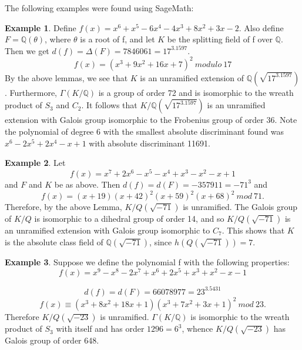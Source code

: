 \documentclass[12pt]{extarticle}
\newcommand{\<}{\langle}
\renewcommand{\>}{\rangle}
\theoremstyle{definition}
\newtheorem*{example}{Example}
\begin{document}
The following examples were found using SageMath:
\begin{example}
Define $f(x)=x^6 + x^5 - 6x^4 - 4x^3 + 8x^2 + 3x - 2$. Also define $F=\mathbb{Q}(\theta)$, where $\theta$ is a root of f, and let $K$ be the splitting field of f over $\mathbb{Q}$. Then we get $d(f)=\Delta(F)=7846061=17^3.1597$. 
\begin{equation}
   f(x)= (x^3 + 9x^2 + 16x + 7)^2\:modulo\:17
\end{equation}
By the above lemmas, we see that $K$ is an unramified extension of $\mathbb{Q}(\sqrt{17^3.1597})$. Furthermore, $\Gamma(K/\mathbb{Q})$ is a group of order 72 and is isomorphic to the wreath product of $S_3$ and $C_2$. It follows that $K/\mathbb{Q}(\sqrt{17^3.1597})$ is an unramified extension with Galois group isomorphic to the Frobenius group of order 36.
Note the polynomial of degree 6 with the smallest absolute discriminant found was $x^6 - 2x^5 + 2x^4 - x + 1$ with absolute discriminant 11691.
\end{example}
\begin{example}
 Let \begin{equation}
     f(x)=x^7 + 2x^6 - x^5 - x^4 + x^3 - x^2 - x + 1
 \end{equation}and $F$ and $K$ be as above.
Then $d(f)=d(F)=-357911=-71^{3}$ and
\begin{equation}
    f(x)=(x + 19)(x + 42)^2 (x + 59)^2(x + 68)^2\:mod\:71.
\end{equation}
Therefore, by the above Lemma, $K/Q(\sqrt{-71})$ is unramified. The Galois group of $K/Q$
is isomorphic to a dihedral group of order 14, and so $K/Q(\sqrt{-71})$
is an unramified extension with Galois group isomorphic to $C_7$.
This shows that $K$ is the absolute class field of $\mathbb{Q}(\sqrt{-71})$, since $h(Q(\sqrt{-71}))=7$.
\end{example}
\begin{example}
    Suppose we define the polynomial f with the following properties: \begin{equation}
        f(x) =x^9 - x^8 - 2x^7 + x^6 + 2x^5 + x^3 + x^2 - x - 1
    \end{equation} \par
    \begin{equation}
        d(f)=d(F)=66078977=23^3.5431
    \end{equation} 
    \begin{equation}
        f(x)\equiv(x^3 + 8x^2 + 18x + 1)(x^3 + 7x^2 + 3x + 1)^2\:mod\:23.
    \end{equation}
Therefore  $K/Q(\sqrt{-23})$ is unramified. $\Gamma(K/\mathbb{Q})$ is isomorphic to the wreath product of $S_3$ with itself and has order $1296=6^3$, whence $K/Q(\sqrt{-23})$ has Galois group of order 648.
\end{example}
\end{document}
